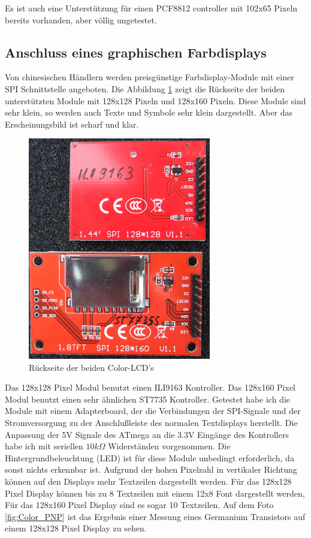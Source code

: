 Es ist auch eine Unterstützung für einen PCF8812 controller mit 102x65 Pixeln bereits vorhanden,
aber völlig ungetestet.

\subsection{Anschluss eines graphischen Farbdisplays}

Von chinesischen Händlern werden preisgünstige Farbdisplay-Module mit einer SPI Schnittstelle angeboten.
Die Abbildung \ref{fig:Color_both} zeigt die Rückseite der beiden unterstützten Module mit 128x128 Pixeln
und 128x160 Pixeln.
Diese Module sind sehr klein, so werden auch Texte und Symbole sehr klein dargestellt.
Aber das Erscheinungsbild ist scharf und klar.

\begin{figure}[H]
\centering
\includegraphics[width=8cm]{../PNG/Color_ILI9163_ST7735.jpg}
\caption{Rückseite der beiden Color-LCD's}
\label{fig:Color_both}
\end{figure}

Das 128x128 Pixel Modul benutzt einen ILI9163 Kontroller.
Das 128x160 Pixel Modul benutzt einen sehr ähnlichen ST7735 Kontroller.
Getestet habe ich die Module mit einem Adapterboard, der die Verbindungen
der SPI-Signale und der Stromversorgung zu der Anschlußleiste des normalen Textdisplays
herstellt. Die Anpassung der 5V Signale des ATmega an die 3.3V Eingänge des Kontrollers
habe ich mit seriellen \(10 k\Omega\) Widerständen vorgenommen.
Die Hintergrundbeleuchtung (LED) ist für diese Module unbedingt erforderlich, da sonst
nichts erkennbar ist.
Aufgrund der hohen Pixelzahl in vertikaler Richtung können auf den Displays mehr Textzeilen dargestellt
werden. Für das 128x128 Pixel Display können bis zu 8 Textzeilen mit einem 12x8 Font dargestellt werden,
Für das 128x160 Pixel Display sind es sogar 10 Textzeilen.
Auf dem Foto \ref{fig:Color_PNP} ist das Ergebnis einer Messung eines Germanium Transistors auf einem
128x128 Pixel Display zu sehen.

